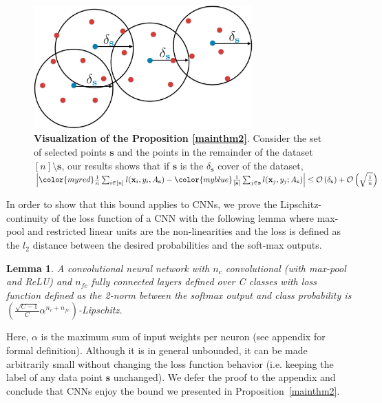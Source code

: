 \documentclass{article} %
\makeatletter
\newtheorem{lemma}{Lemma}
\newcommand*{\ie}{i.e.\@\xspace}
\makeatother
\begin{document}
\begin{figure}[t]
\vspace{-5mm}
    \begin{center} \includegraphics[width=0.75\textwidth]{thm.pdf} \end{center} 
        \caption{\textbf{Visualization of the Proposition \ref{mainthm2}}. Consider the set of selected points
        {\color{myblue} $\mathbf{s}$} and the points in the remainder of the dataset {\color{myred} $[n] \setminus
        \mathbf{s}$}, our results shows that if $\mathbf{s}$ is the $\delta_{\mathbf{s}}$ cover of the dataset, 
        $\left| {\color{myred} \frac{1}{n}\sum_{i \in [n]} l(\mathbf{x}_i,y_i,A_{\mathbf{s}})} -{\color{myblue} \frac{1}{|\mathbf{s}|}\sum_{j \in
        \mathbf{s}} l(\mathbf{x}_j,y_j;A_{\mathbf{s}})}
    \right| \leq \mathcal{O}\left(\delta_\mathbf{s}\right) + \mathcal{O}\left(\sqrt{\frac{1}{n}}\right)$}
    \label{fig:thm}
    \end{figure}

In order to show that this bound applies to CNNs, we prove the Lipschitz-continuity of the loss function of a CNN with
the following lemma where max-pool and restricted linear units are the non-linearities and the loss is defined as the $l_2$ distance between the desired probabilities and the soft-max outputs.

\begin{lemma} A convolutional neural network with $n_c$ convolutional (with max-pool and ReLU) and $n_{fc}$ fully
connected layers defined over C classes with loss function defined as the 2-norm between the softmax output and class
probability is $\left(\frac{\sqrt{C-1}}{C} \alpha^{n_c+n_{fc}}\right)$-Lipschitz. \end{lemma}

Here, $\alpha$ is the maximum sum of  input weights per neuron (see appendix for formal definition). Although it is in
general unbounded, it can be made arbitrarily small without changing the loss function behavior (\ie keeping the label
of any data point $\mathbf{s}$ unchanged). We defer the proof to the appendix and conclude that CNNs enjoy the bound we
presented in Proposition~\ref{mainthm2}.
\end{document}
